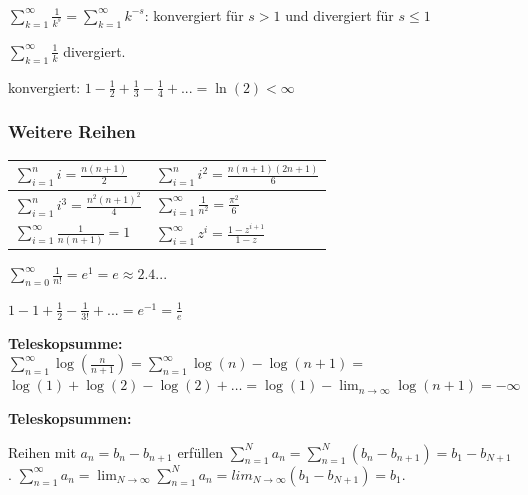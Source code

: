 \subsubsection{}
$\sum_{k=1}^{\infty} \frac{1}{k^s} = \sum_{k=1}^{\infty} k^{-s}$: konvergiert für $s > 1$ und divergiert für $s \leq 1$

$\sum_{k=1}^{\infty} \frac{1}{k}$ divergiert.

 konvergiert: $1 - \frac{1}{2} + \frac{1}{3} - \frac{1}{4} + ... = \ln(2) < \infty$

\subsubsection{Weitere Reihen}
\bgroup
\def\arraystretch{2}
\begin{center}
	\begin{tabular}{ | l | l | }
		 \hline
	 	$\sum_{i = 1}^{n} i = \frac{n(n+1)}{2}$ & $\sum_{i=1}^{n} i^2 = \frac{n(n+1)(2n+1)}{6}$ \\
		 \hline 
	 	$\sum_{i=1}^{n} i^3 = \frac{n^2(n+1)^2}{4}$ & $\sum_{i = 1}^{\infty} \frac{1}{n^2} = \frac{\pi^2}{6}$ \\
		 \hline  
	 	$\sum_{i = 1}^{\infty} \frac{1}{n(n+1)} = 1$ & $\sum_{i = 1}^\infty z^i = \frac{1 - z^{i + 1}}{1 - z}$ \\
		 \hline   
	\end{tabular}
\end{center}
\egroup

$\sum_{n=0}^{\infty}\frac{1}{n!} = e^1 = e \approx 2.4...$

$1 - 1 + \frac{1}{2} - \frac{1}{3!} + ... = e^{-1} = \frac{1}{e}$

\textbf{Teleskopsumme:} \\
$\sum_{n = 1}^\infty \log \left(\frac{n}{n+1}\right) = \sum_{n = 1}^\infty \log(n) - \log(n + 1) = $ 
$\log(1) + \log(2) - \log(2) + \dots  = \log(1) - \lim_{n \to \infty} \log(n + 1) = - \infty$ \medskip \\ 

\begin{exercise}
    \textbf{Teleskopsummen:}

    Reihen mit $a_n=b_n - b_{n+1}$ erfüllen $\sum_{n=1}^{N} a_n = \sum_{n=1}^{N} (b_n - b_{n+1}) = b_1 - b_{N+1}$.
    $\sum_{n=1}^{\infty}a_n = \lim_{N \rightarrow \infty}\sum_{n=1}^{N} a_n = lim_{N \rightarrow \infty} (b_1 - b_{N+1})=b_1$.
\end{exercise}


